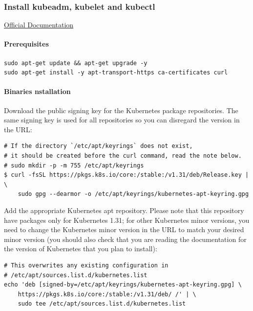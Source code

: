 \documentclass{article}
\newenvironment{codetemplate}[1][]{%
  \mybasecolorbox[#1]
  \itshape
}{%
  \endmybasecolorbox
}
\begin{document}
\subsubsection{Install kubeadm, kubelet and kubectl}

\href{https://kubernetes.io/docs/setup/production-environment/tools/kubeadm/install-kubeadm/}{Official Documentation}

\paragraph{Prerequisites}
\begin{codetemplate}{}
\begin{verbatim}
sudo apt-get update && apt-get upgrade -y
sudo apt-get install -y apt-transport-https ca-certificates curl
\end{verbatim}
\end{codetemplate}

\paragraph{Binaries nstallation}
Download the public signing key for the Kubernetes package repositories. The same signing key is used for all repositories so you can disregard the version in the URL:
\begin{codetemplate}{}
\begin{verbatim}
# If the directory `/etc/apt/keyrings` does not exist, 
# it should be created before the curl command, read the note below.
# sudo mkdir -p -m 755 /etc/apt/keyrings
$ curl -fsSL https://pkgs.k8s.io/core:/stable:/v1.31/deb/Release.key | \
    sudo gpg --dearmor -o /etc/apt/keyrings/kubernetes-apt-keyring.gpg
\end{verbatim}
\end{codetemplate}

Add the appropriate Kubernetes apt repository. Please note that this repository have packages only for Kubernetes 1.31; for other Kubernetes minor versions, you need to change the Kubernetes minor version in the URL to match your desired minor version (you should also check that you are reading the documentation for the version of Kubernetes that you plan to install):
\begin{codetemplate}{}
\begin{verbatim}
# This overwrites any existing configuration in 
# /etc/apt/sources.list.d/kubernetes.list
echo 'deb [signed-by=/etc/apt/keyrings/kubernetes-apt-keyring.gpg] \
    https://pkgs.k8s.io/core:/stable:/v1.31/deb/ /' | \
    sudo tee /etc/apt/sources.list.d/kubernetes.list
\end{verbatim}
\end{codetemplate}
\end{document}
